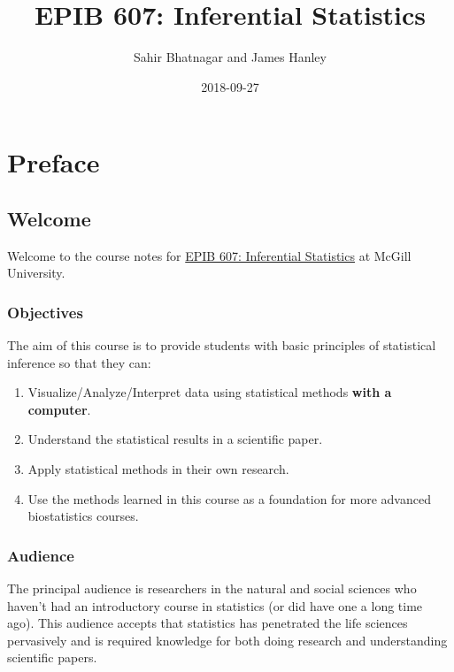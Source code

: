\documentclass[]{book}
\title{EPIB 607: Inferential Statistics}
\author{Sahir Bhatnagar and James Hanley}
\date{2018-09-27}
\providecommand{\tightlist}{%
  \setlength{\itemsep}{0pt}\setlength{\parskip}{0pt}}
\providecommand{\tightlist}{%
  \setlength{\itemsep}{0pt}\setlength{\parskip}{0pt}}
\theoremstyle{definition}
\theoremstyle{definition}
\theoremstyle{definition}
\theoremstyle{remark}
\begin{document}
\maketitle

{
\setcounter{tocdepth}{1}
\tableofcontents
}
\part{Preface}\label{part-preface}

\chapter{Welcome}\label{welcome}

Welcome to the course notes for
\href{https://www.mcgill.ca/study/2018-2019/courses/epib-607}{EPIB 607:
Inferential Statistics} at McGill University.

\section{Objectives}\label{objectives}

The aim of this course is to provide students with basic principles of
statistical inference so that they can:

\begin{enumerate}
\def\labelenumi{\arabic{enumi}.}
\tightlist
\item
  Visualize/Analyze/Interpret data using statistical methods
  \textbf{with a computer}.
\item
  Understand the statistical results in a scientific paper.\\
\item
  Apply statistical methods in their own research.\\
\item
  Use the methods learned in this course as a foundation for more
  advanced biostatistics courses.
\end{enumerate}

\section{Audience}\label{audience}

The principal audience is researchers in the natural and social sciences
who haven't had an introductory course in statistics (or did have one a
long time ago). This audience accepts that statistics has penetrated the
life sciences pervasively and is required knowledge for both doing
research and understanding scientific papers.
\end{document}
